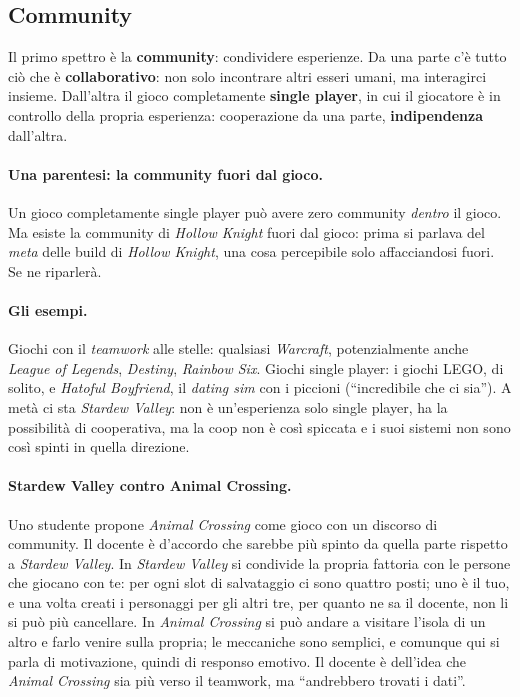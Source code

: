 \subsection{Community}

Il primo spettro è la \textbf{community}: condividere esperienze. Da una
parte c'è tutto ciò che è \textbf{collaborativo}: non solo incontrare altri
esseri umani, ma interagirci insieme. Dall'altra il gioco completamente
\textbf{single player}, in cui il giocatore è in controllo della propria
esperienza: cooperazione da una parte, \textbf{indipendenza} dall'altra.

\paragraph{Una parentesi: la community fuori dal gioco.} Un gioco
completamente single player può avere zero community \emph{dentro} il gioco.
Ma esiste la community di \emph{Hollow Knight} fuori dal gioco: prima si
parlava del \emph{meta} delle build di \emph{Hollow Knight}, una cosa
percepibile solo affacciandosi fuori. Se ne riparlerà.

\paragraph{Gli esempi.} Giochi con il \emph{teamwork} alle stelle: qualsiasi
\emph{Warcraft}, potenzialmente anche \emph{League of Legends},
\emph{Destiny}, \emph{Rainbow Six}. Giochi single player: i giochi LEGO, di
solito, e \emph{Hatoful Boyfriend}, il \emph{dating sim} con i piccioni
(``incredibile che ci sia''). A metà ci sta \emph{Stardew Valley}: non è
un'esperienza solo single player, ha la possibilità di cooperativa, ma la coop
non è così spiccata e i suoi sistemi non sono così spinti in quella
direzione.

\paragraph{Stardew Valley contro Animal Crossing.} Uno studente propone
\emph{Animal Crossing} come gioco con un discorso di community. Il docente è
d'accordo che sarebbe più spinto da quella parte rispetto a \emph{Stardew
Valley}. In \emph{Stardew Valley} si condivide la propria fattoria con le
persone che giocano con te: per ogni slot di salvataggio ci sono quattro
posti; uno è il tuo, e una volta creati i personaggi per gli altri tre, per
quanto ne sa il docente, non li si può più cancellare. In \emph{Animal
Crossing} si può andare a visitare l'isola di un altro e farlo venire sulla
propria; le meccaniche sono semplici, e comunque qui si parla di motivazione,
quindi di responso emotivo. Il docente è dell'idea che \emph{Animal Crossing}
sia più verso il teamwork, ma ``andrebbero trovati i dati''.

